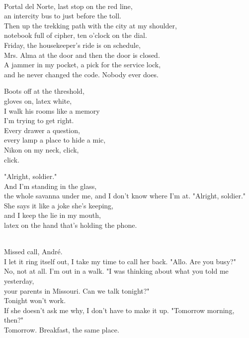 \begin{lyrics}

\\
Portal del Norte, last stop on the red line,\\
an intercity bus to just before the toll.\\
Then up the trekking path with the city at my shoulder,\\
notebook full of cipher, ten o'clock on the dial.\\
Friday, the housekeeper's ride is on schedule,\\
Mrs. Alma at the door and then the door is closed.\\
A jammer in my pocket, a pick for the service lock,\\
and he never changed the code. Nobody ever does.

Boots off at the threshold,\\
gloves on, latex white,\\
I walk his rooms like a memory\\
I'm trying to get right.\\
Every drawer a question,\\
every lamp a place to hide a mic,\\
Nikon on my neck, click,\\
click.

"Alright, soldier."
\\
And I'm standing in the glass,\\
the whole savanna under me, and I don't know where I'm at.
"Alright, soldier."
\\
She says it like a joke she's keeping,\\
and I keep the lie in my mouth,\\
latex on the hand that's holding the phone.

\\
Missed call, André.\\
I let it ring itself out, I take my time to call her back.
"Allo. Are you busy?"
\\
No, not at all. I'm out in a walk.
"I was thinking about what you told me yesterday,\\
your parents in Missouri. Can we talk tonight?"
\\
Tonight won't work.
\\
If she doesn't ask me why, I don't have to make it up.
"Tomorrow morning, then?"
\\
Tomorrow. Breakfast, the same place.


\end{lyrics}

